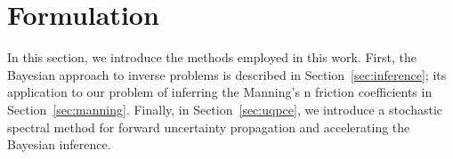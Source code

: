 \section{Formulation}
\label{sec:formu}
In this section, we introduce the methods employed in this work.
First, the Bayesian approach to inverse problems is described in Section~\ref{sec:inference};
its application to our problem of inferring the Manning's n friction coefficients in Section~\ref{sec:manning}.
Finally, in Section~\ref{sec:uqpce}, we introduce
a stochastic spectral method for forward uncertainty propagation and accelerating the Bayesian inference.






